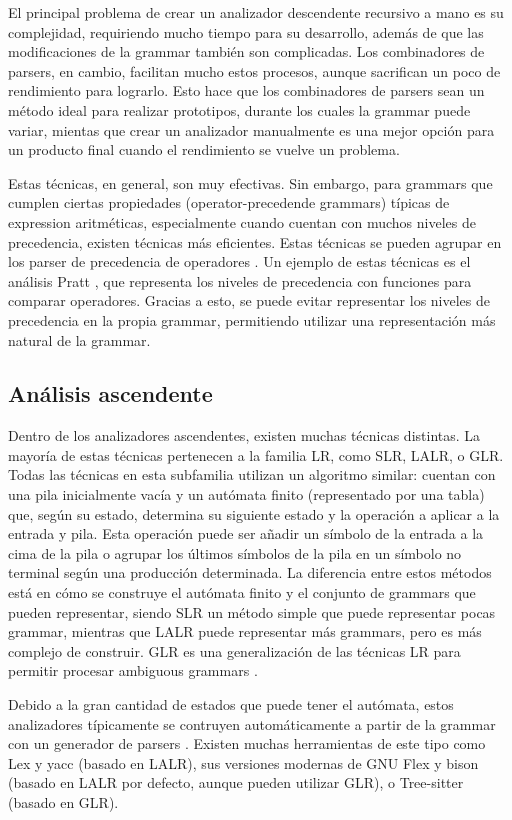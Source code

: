 El principal problema de crear un analizador descendente recursivo a mano es su
complejidad, requiriendo mucho tiempo para su desarrollo, además de que las
modificaciones de la \gls{grammar} también son complicadas. Los combinadores de
\glspl{parser}, en cambio, facilitan mucho estos procesos, aunque sacrifican un
poco de rendimiento para lograrlo. Esto hace que los combinadores de
\glspl{parser} sean un método ideal para realizar prototipos, durante los cuales
la \gls{grammar} puede variar, mientas que crear un analizador manualmente es
una mejor opción para un producto final cuando el rendimiento se vuelve un
problema.

Estas técnicas, en general, son muy efectivas. Sin embargo, para \glspl{grammar}
que cumplen ciertas propiedades (\glspl{operator-precedende grammar}) típicas de
\gls{expression} aritméticas, especialmente cuando cuentan con muchos niveles de
precedencia, existen técnicas más eficientes. Estas técnicas se pueden agrupar
en los \gls{parser} de precedencia de operadores
\parencite{operator-precedence-parser}. Un ejemplo de estas técnicas es el
análisis Pratt \parencite{pratt-parsing-paper}
\parencite{pratt-parsing-example}, que representa los niveles de precedencia con
funciones para comparar operadores. Gracias a esto, se puede evitar representar los niveles de
precedencia en la propia \gls{grammar}, permitiendo utilizar una representación
más natural de la \gls{grammar}.

\subsection{Análisis ascendente}

Dentro de los analizadores ascendentes, existen muchas técnicas distintas. La
mayoría de estas técnicas pertenecen a la familia LR, como SLR, LALR, o GLR.
Todas las técnicas en esta subfamilia utilizan un algoritmo similar: cuentan con
una pila inicialmente vacía y un autómata finito (representado por una tabla)
que, según su estado, determina su siguiente estado y la operación a aplicar a
la entrada y pila. Esta operación puede ser añadir un símbolo de la entrada a la
cima de la pila o agrupar los últimos símbolos de la pila en un símbolo no
terminal según una producción determinada. La diferencia entre estos métodos
está en cómo se construye el autómata finito y el conjunto de \glspl{grammar}
que pueden representar, siendo SLR un método simple que puede representar pocas
\gls{grammar}, mientras que LALR puede representar más \glspl{grammar}, pero es
más complejo de construir. \parencite{dragon-book} GLR es una generalización de
las técnicas LR para permitir procesar \glspl{ambiguous grammar}
\parencite{GLR-algorithm}.

Debido a la gran cantidad de estados que puede tener el autómata, estos
analizadores típicamente se contruyen automáticamente a partir de la
\gls{grammar} con un generador de \glspl{parser} \parencite{dragon-book}.
Existen muchas herramientas de este tipo como Lex y yacc \parencite{yacc}
(basado en LALR), sus versiones modernas de GNU Flex y bison \parencite{bison}
(basado en LALR por defecto, aunque pueden utilizar GLR), o Tree-sitter
\parencite{tree-sitter} (basado en GLR).
